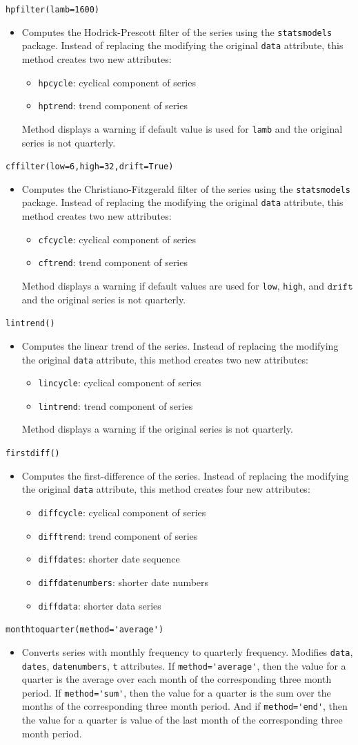 \documentclass[11pt,fleqn]{article}
\newcommand{\IZ}{\begin{itemize}}
\newcommand{\ZI}{\end{itemize}}
\newcommand{\itemb}{\item[]}
\newcommand{\ttt}{\texttt}
\begin{document}
	\itemb \ttt{hpfilter(lamb=1600)}
		\IZ
		\itemb Computes the Hodrick-Prescott filter of the series using the \ttt{statsmodels} package. Instead of replacing the modifying the original \ttt{data} attribute, this method creates two new attributes:
			\IZ
            \itemb \ttt{hpcycle}: cyclical component of series
            \itemb \ttt{hptrend}: trend component of series
            \ZI
		Method displays a warning if default value is used for \ttt{lamb} and the original series is not quarterly.
        \ZI
		
	\itemb \ttt{cffilter(low=6,high=32,drift=True)}
		\IZ
		\itemb Computes the Christiano-Fitzgerald filter of the series using the \ttt{statsmodels} package. Instead of replacing the modifying the original \ttt{data} attribute, this method creates two new attributes:
			\IZ
            \itemb \ttt{cfcycle}: cyclical component of series
            \itemb \ttt{cftrend}: trend component of series
            \ZI
		Method displays a warning if default values are used for \ttt{low}, \ttt{high}, and $\ttt{drift}$ and the original series is not quarterly.
        \ZI
	
	\itemb \ttt{lintrend()}
		\IZ
		\itemb Computes the linear trend of the series. Instead of replacing the modifying the original \ttt{data} attribute, this method creates two new attributes:
			\IZ
            \itemb \ttt{lincycle}: cyclical component of series
            \itemb \ttt{lintrend}: trend component of series
            \ZI
		Method displays a warning if the original series is not quarterly.
        \ZI
		
	\itemb \ttt{firstdiff()}
		\IZ
		\itemb Computes the first-difference of the series. Instead of replacing the modifying the original \ttt{data} attribute, this method creates four new attributes:
			\IZ
            \itemb \ttt{diffcycle}: cyclical component of series
            \itemb \ttt{difftrend}: trend component of series
            \itemb \ttt{diffdates}: shorter date sequence
            \itemb \ttt{diffdatenumbers}: shorter date numbers
            \itemb \ttt{diffdata}: shorter data series
            \ZI
        \ZI
		
	\itemb \verb!monthtoquarter(method='average')!
		\IZ
		\itemb Converts series with monthly frequency to quarterly frequency. Modifies \ttt{data}, \ttt{dates}, \ttt{datenumbers}, \ttt{t} attributes. If \verb!method='average'!, then the value for a quarter is the average over each month of the corresponding three month period. If \verb!method='sum'!, then the value for a quarter is the sum over the months of the corresponding three month period. And if \verb!method='end'!, then the value for a quarter is value of the last  month of the corresponding three month period. 
		\ZI		
	
\end{document}
